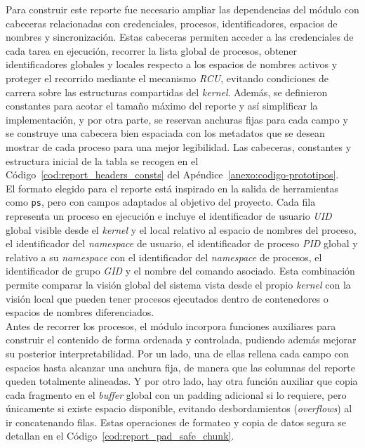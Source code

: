 Para construir este reporte fue necesario ampliar las dependencias del módulo con cabeceras relacionadas con credenciales, procesos, identificadores, espacios de nombres y sincronización.
Estas cabeceras permiten acceder a las credenciales de cada tarea en ejecución, recorrer la lista global de procesos, obtener identificadores globales y locales respecto a los espacios de nombres activos y proteger el recorrido mediante el mecanismo \textit{RCU}, evitando condiciones de carrera sobre las estructuras compartidas del \textit{kernel}.
Además, se definieron constantes para acotar el tamaño máximo del reporte y así simplificar la implementación, y por otra parte, se reservan anchuras fijas para cada campo y se construye una cabecera bien espaciada con los metadatos que se desean mostrar de cada proceso para una mejor legibilidad.
Las cabeceras, constantes y estructura inicial de la tabla se recogen en el Código~\ref{cod:report_headers_consts} del Apéndice~\ref{anexo:codigo-prototipos}.\\

El formato elegido para el reporte está inspirado en la salida de herramientas como \texttt{ps}, pero con campos adaptados al objetivo del proyecto.
Cada fila representa un proceso en ejecución e incluye el identificador de usuario \textit{UID} global visible desde el \textit{kernel} y el local relativo al espacio de nombres del proceso, el identificador del \textit{namespace} de usuario, el identificador de proceso \textit{PID} global y relativo a su \textit{namespace} con el identificador del \textit{namespace} de procesos, el identificador de grupo \textit{GID} y el nombre del comando asociado.
Esta combinación permite comparar la visión global del sistema vista desde el propio \textit{kernel} con la visión local que pueden tener procesos ejecutados dentro de contenedores o espacios de nombres diferenciados.\\

Antes de recorrer los procesos, el módulo incorpora funciones auxiliares para construir el contenido de forma ordenada y controlada, pudiendo además mejorar su posterior interpretabilidad.
Por un lado, una de ellas rellena cada campo con espacios hasta alcanzar una anchura fija, de manera que las columnas del reporte queden totalmente alineadas.
Y por otro lado, hay otra función auxiliar que copia cada fragmento en el \textit{buffer} global con un padding adicional si lo requiere, pero únicamente si existe espacio disponible, evitando desbordamientos (\textit{overflows}) al ir concatenando filas.
Estas operaciones de formateo y copia de datos segura se detallan en el Código~\ref{cod:report_pad_safe_chunk}.\\

